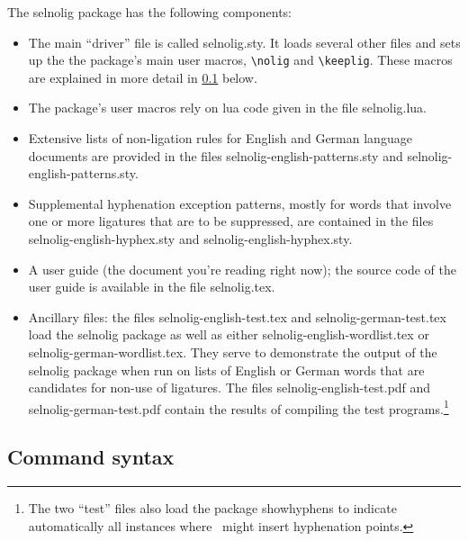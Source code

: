 \documentclass[12pt]{article}
\newcommand{\pkg}[1]{\textsf{#1}}
\newcommand{\cmmd}[1]{\texttt{\textbackslash #1}}
\begin{document}
The \pkg{selnolig} package has the following components:
\begin{itemize}
\item The main \enquote{driver} file is called  \pkg{selnolig.sty}. It loads several other files and sets up the the package's main user macros, \cmmd{nolig} and \cmmd{keeplig}. These macros are explained in more detail in \cref{sec:syntax} below.
\item The package's user macros rely on lua code given in the file \pkg{selnolig.lua}. 
\item Extensive lists of non-ligation rules for English and German language documents are provided in the files \pkg{selnolig-english-patterns.sty} and \pkg{selnolig-english-patterns.sty}. 
\item Supplemental hyphenation exception patterns, mostly for words that involve one or more ligatures that are to be suppressed, are contained in the files \pkg{selnolig-english-hyphex.sty} and \pkg{selnolig-english-hyphex.sty}.
\item A user guide (the document you're reading right now); the source code of the user guide is available in the file \pkg{selnolig.tex}. 

\item Ancillary files: the files \pkg{selnolig-english-test.tex} and \pkg{selnolig-german-test.tex} load the \pkg{selnolig} package as well as either \pkg{selnolig-english-wordlist.tex} or \pkg{selnolig-german-wordlist.tex}. They serve to demonstrate the output of the \pkg{selnolig} package when run on lists of English or German words that are candidates for non-use of ligatures. The files \pkg{selnolig-english-test.pdf} and \pkg{selnolig-german-test.pdf} contain the results of compiling the test programs.\footnote{The two \enquote{test} files also load the package \pkg{showhyphens} to indicate automatically all instances where \LuaLaTeX\ might insert hyphenation points.}

\end{itemize}


\subsection{Command syntax} \label{sec:syntax}
\end{document}
